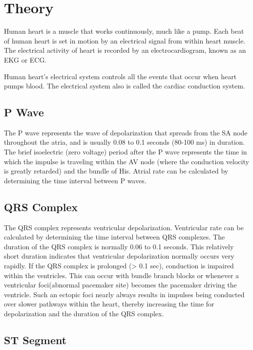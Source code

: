 \documentclass[
  11pt,
  letterpaper,
  DIV=11,
  numbers=noendperiod]{scrreprt}
\begin{document}
\section{Theory}\label{theory-5}

Human heart is a muscle that works continuously, much like a pump. Each
beat of human heart is set in motion by an electrical signal from within
heart muscle. The electrical activity of heart is recorded by an
electrocardiogram, known as an EKG or ECG.

Human heart's electrical system controls all the events that occur when
heart pumps blood. The electrical system also is called the cardiac
conduction system.

\subsection{P Wave}\label{p-wave}

The P wave represents the wave of depolarization that spreads from the
SA node throughout the atria, and is usually 0.08 to 0.1 seconds (80-100
ms) in duration. The brief isoelectric (zero voltage) period after the P
wave represents the time in which the impulse is traveling within the AV
node (where the conduction velocity is greatly retarded) and the bundle
of His. Atrial rate can be calculated by determining the time interval
between P waves.

\subsection{QRS Complex}\label{qrs-complex}

The QRS complex represents ventricular depolarization. Ventricular rate
can be calculated by determining the time interval between QRS
complexes. The duration of the QRS complex is normally 0.06 to 0.1
seconds. This relatively short duration indicates that ventricular
depolarization normally occurs very rapidly. If the QRS complex is
prolonged (\textgreater{} 0.1 sec), conduction is impaired within the
ventricles. This can occur with bundle branch blocks or whenever a
ventricular foci(abnormal pacemaker site) becomes the pacemaker driving
the ventricle. Such an ectopic foci nearly always results in impulses
being conducted over slower pathways within the heart, thereby
increasing the time for depolarization and the duration of the QRS
complex.

\subsection{ST Segment}\label{st-segment}
\end{document}
